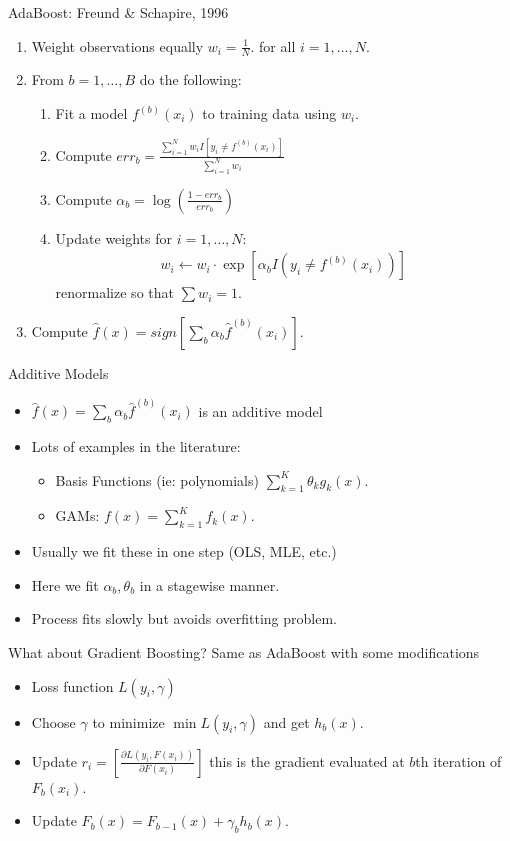 \documentclass[xcolor=pdftex,dvipsnames,table,mathserif,aspectratio=169]{beamer}
\begin{document}
\begin{frame}{ AdaBoost: Freund \& Schapire, 1996}
\begin{enumerate}
\item Weight observations equally $w_i = \frac{1}{N}$. for all $i=1,\ldots,N$.
\item From $b=1,\ldots, B$ do the following:
\begin{enumerate}
\item Fit a model  $f^{(b)}(x_i)$ to training data using $w_i$.
\item Compute $err_b = \frac{\sum_{i=1}^N w_i I[ y_i \neq f^{(b)}(x_i) ]}{\sum_{i=1}^N w_i}$
\item Compute $\alpha_b = \log \left(  \frac{1-err_b}{err_b}\right)$
\item Update weights for $i=1,\ldots,N$: 
\begin{align*}
w_i \leftarrow w_i \cdot \exp[\alpha_b I (y_i \neq f^{(b)}(x_i)) ]
\end{align*}
renormalize so that $\sum w_i =1$.
\end{enumerate}
\item Compute $\hat{f}(x) = sign[ \sum_{b} \alpha_b \hat{f}^{(b)}(x_i)]$.
\end{enumerate}
\end{frame}


\begin{frame}{Additive Models}
\begin{itemize}
\item $\hat{f}(x) = \sum_{b} \alpha_b \hat{f}^{(b)}(x_i)$ is an \alert{additive model}
\item Lots of examples in the literature:
\begin{itemize}
\item  Basis Functions (ie: polynomials) $\sum_{k=1}^K \theta_k g_k(x)$.
\item GAMs: $f(x) = \sum_{k=1}^K f_k(x)$.
\end{itemize}
\item Usually we fit these in \alert{one step} (OLS, MLE, etc.)
\item Here we fit $\alpha_b, \theta_b$ in a \alert{stagewise} manner.
\item Process fits slowly but avoids overfitting problem.
\end{itemize}
\end{frame}




\begin{frame}{What about Gradient Boosting?}
Same as AdaBoost with some modifications
\begin{itemize}
\item Loss function $L(y_i,\gamma)$
\item Choose $\gamma$ to minimize $\min L(y_i,\gamma)$ and get $h_b(x)$.
\item Update $r_i = \left[ \frac{\partial L(y_i, F(x_i))}{ \partial F(x_i)} \right]$ this is the \alert{gradient} evaluated at $b$th iteration of $F_b(x_i)$.
\item Update $F_b(x) = F_{b-1}(x) + \gamma_b h_b(x)$.
\end{itemize}
\end{frame}
\end{document}
